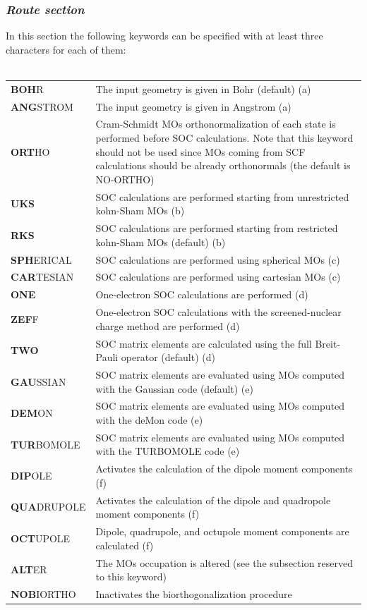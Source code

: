 \documentclass[a4paper,12pt]{article}
\begin{document}
\subsubsection{{\em Route section}}
In this section the following keywords can be specified with at least three characters for each of them: \\ \\
\begin{tabular}{@{}p{3.2 cm}p{12.0 cm}@{}}
{\bf BOH}R        &   The input geometry is given in Bohr (default) (a) \\
{\bf ANG}STROM    &   The input geometry is given in Angstrom (a) \\
{\bf ORT}HO       &   Cram-Schmidt MOs orthonormalization of each state is 
                      performed before SOC calculations. Note that this keyword  
                      should not be used since MOs coming from SCF calculations 
                      should be already orthonormals (the default is NO-ORTHO) \\
{\bf UKS}         &   SOC calculations are performed starting from unrestricted  
                      kohn-Sham MOs (b) \\
{\bf RKS}         &   SOC calculations are performed starting from restricted 
                      kohn-Sham MOs (default) (b) \\
{\bf SPH}ERICAL   &   SOC calculations are performed using spherical MOs (c) \\
{\bf CAR}TESIAN   &   SOC calculations are performed using cartesian MOs (c) \\
{\bf ONE}         &   One-electron SOC calculations are performed (d) \\
{\bf ZEF}F        &   One-electron SOC calculations with the screened-nuclear charge 
                      method are performed\cite{Chiod2} (d) \\
{\bf TWO}         &   SOC matrix elements are calculated using the full Breit-Pauli 
                      operator (default) (d) \\
{\bf GAU}SSIAN    &   SOC matrix elements are evaluated using MOs computed with the {\sf Gaussian} code (default) (e) \\
{\bf DEM}ON       &   SOC matrix elements are evaluated using MOs computed with the {\sf deMon} code (e) \\
{\bf TUR}BOMOLE   &   SOC matrix elements are evaluated using MOs computed with the {\sf TURBOMOLE} code (e) \\

{\bf DIP}OLE      &   Activates the calculation of the dipole moment components (f) \\
{\bf QUA}DRUPOLE  &   Activates the calculation of the dipole and quadropole moment components (f) \\
{\bf OCT}UPOLE    &   Dipole, quadrupole, and octupole moment components 
                      are calculated (f) \\
{\bf ALT}ER       &   The MOs occupation is altered (see the subsection reserved
                      to this keyword) \\
{\bf NOB}IORTHO   &   Inactivates the biorthogonalization procedure \\
\end{tabular}
\end{document}
